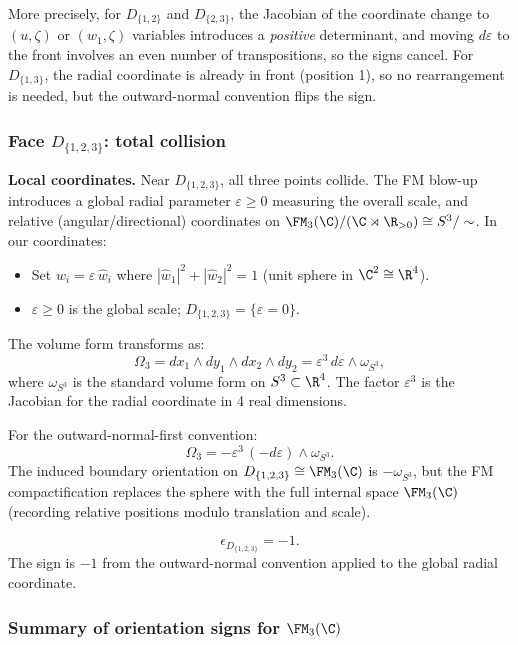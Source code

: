 More precisely, for $D_{\{1,2\}}$ and $D_{\{2,3\}}$, the Jacobian of the coordinate change to $(u,\zeta)$ or $(w_1,\zeta)$ variables introduces a \emph{positive} determinant, and moving $d\varepsilon$ to the front involves an even number of transpositions, so the signs cancel. For $D_{\{1,3\}}$, the radial coordinate is already in front (position 1), so no rearrangement is needed, but the outward-normal convention flips the sign.

\subsubsection{\texorpdfstring{Face $D_{\{1,2,3\}}$: total collision}{Face D123: total collision}}

\textbf{Local coordinates.} Near $D_{\{1,2,3\}}$, all three points collide. The FM blow-up introduces a global radial parameter $\varepsilon \ge 0$ measuring the overall scale, and relative (angular/directional) coordinates on $\FM_3(\C)/(\C\rtimes\R_{>0}) \cong S^3/\sim$. In our coordinates:
\begin{itemize}
\item Set $w_i = \varepsilon\,\hat{w}_i$ where $|\hat{w}_1|^2 + |\hat{w}_2|^2 = 1$ (unit sphere in $\C^2 \cong \R^4$).
\item $\varepsilon \ge 0$ is the global scale; $D_{\{1,2,3\}} = \{\varepsilon = 0\}$.
\end{itemize}
The volume form transforms as:
\[
\Omega_3 = dx_1\wedge dy_1\wedge dx_2\wedge dy_2 = \varepsilon^3\,d\varepsilon\wedge \omega_{S^3},
\]
where $\omega_{S^3}$ is the standard volume form on $S^3 \subset \R^4$. The factor $\varepsilon^3$ is the Jacobian for the radial coordinate in 4 real dimensions.

For the outward-normal-first convention:
\[
\Omega_3 = -\varepsilon^3\,(-d\varepsilon)\wedge\omega_{S^3}.
\]
The induced boundary orientation on $D_{\{1,2,3\}} \cong \FM_3(\C)$ is $-\omega_{S^3}$, but the FM compactification replaces the sphere with the full internal space $\FM_3(\C)$ (recording relative positions modulo translation and scale).

\begin{equation}
\label{eq:eps-D123}
\boxed{\epsilon_{D_{\{1,2,3\}}} = -1.}
\end{equation}
The sign is $-1$ from the outward-normal convention applied to the global radial coordinate.

\subsubsection{\texorpdfstring{Summary of orientation signs for $\FM_3(\C)$}{Summary of orientation signs for FM 3(C)}}


